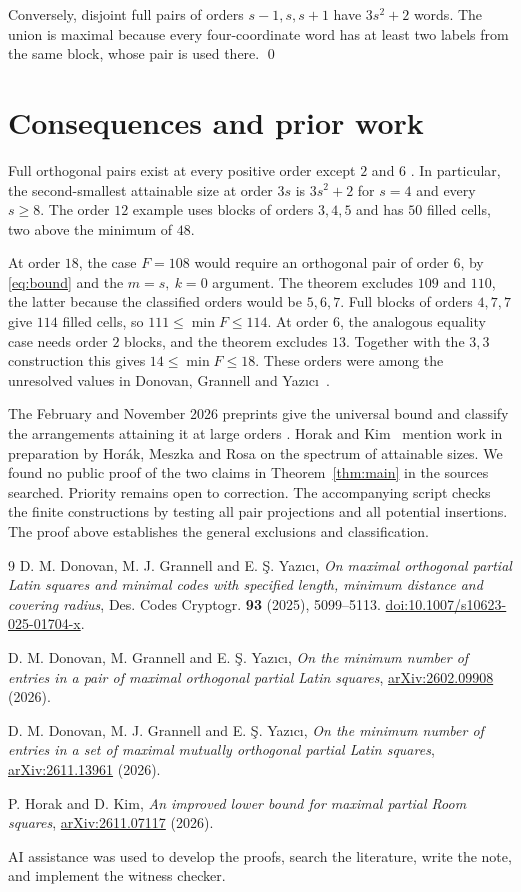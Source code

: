 \documentclass[11pt]{article}
\begin{document}
Conversely, disjoint full pairs of orders \(s-1,s,s+1\) have
\(3s^2+2\) words. The union is maximal because every four-coordinate
word has at least two labels from the same block, whose pair is
used there. \qed

\section{Consequences and prior work}

Full orthogonal pairs exist at every positive order except \(2\)
and \(6\) \cite[Section 1]{feb}. In particular, the second-smallest
attainable size at order \(3s\) is \(3s^2+2\) for \(s=4\) and every
\(s\ge8\). The order \(12\) example uses blocks of orders \(3,4,5\)
and has \(50\) filled cells, two above the minimum of \(48\).

At order \(18\), the case \(F=108\) would require an orthogonal
pair of order \(6\), by \eqref{eq:bound} and the \(m=s,\ k=0\)
argument. The theorem excludes \(109\) and \(110\), the latter
because the classified orders would be \(5,6,7\). Full blocks of
orders \(4,7,7\) give \(114\) filled cells, so
\(111\le \min F\le114\). At order \(6\), the analogous equality
case needs order \(2\) blocks, and the theorem excludes \(13\).
Together with the \(3,3\) construction this gives
\(14\le \min F\le18\). These orders were among the unresolved
values in Donovan, Grannell and Yaz\i c\i~\cite[Table 1]{original}.

The February and November 2026 preprints give the universal bound
and classify the arrangements attaining it at large orders
\cite{feb,nov}. Horak and Kim~\cite{room} mention work in preparation
by Hor\'ak, Meszka and Rosa on the spectrum of attainable sizes.
We found no public proof of the two claims in Theorem~\ref{thm:main}
in the sources searched. Priority remains open to correction.
The accompanying script checks the finite constructions by testing
all pair projections and all potential insertions. The proof above
establishes the general exclusions and classification.

\begin{thebibliography}{9}
 D. M. Donovan, M. J. Grannell and E. \c{S}. Yaz\i c\i,
\emph{On maximal orthogonal partial Latin squares and minimal codes with
specified length, minimum distance and covering radius},
Des. Codes Cryptogr. \textbf{93} (2025), 5099--5113.
\href{https://doi.org/10.1007/s10623-025-01704-x}{doi:10.1007/s10623-025-01704-x}.

 D. M. Donovan, M. Grannell and E. \c{S}. Yaz\i c\i,
\emph{On the minimum number of entries in a pair of maximal orthogonal
partial Latin squares}, \href{https://arxiv.org/abs/2602.09908}{arXiv:2602.09908} (2026).

 D. M. Donovan, M. J. Grannell and E. \c{S}. Yaz\i c\i,
\emph{On the minimum number of entries in a set of maximal mutually
orthogonal partial Latin squares},
\href{https://arxiv.org/abs/2611.13961}{arXiv:2611.13961} (2026).

 P. Horak and D. Kim,
\emph{An improved lower bound for maximal partial Room squares},
\href{https://arxiv.org/abs/2611.07117}{arXiv:2611.07117} (2026).
\end{thebibliography}

\noindent\small AI assistance was used to develop the proofs, search the
literature, write the note, and implement the witness checker.
\end{document}
